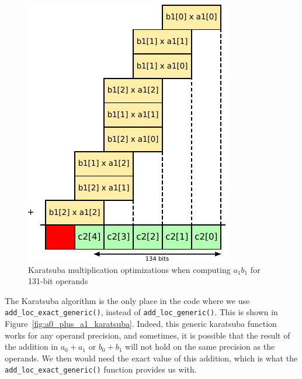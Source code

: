 \documentclass[12pt, a4paper]{report}
\begin{document}
\begin{figure}[h]
\centering
\includegraphics[scale=0.8]{figs/karatsuba_second_level_optimizations}
\caption{Karatsuba multiplication optimizations when computing $a_1 b_1$ for 131-bit operands}
\label{fig:karatsuba_second_level_optimizations}
\end{figure}

The Karatsuba algorithm is the only place in the code where we use
\verb+add_loc_exact_generic()+, instead of \verb+add_loc_generic()+.
This is shown in Figure~\ref{fig:a0_plus_a1_karatsuba}.
Indeed, this generic karatsuba function works for any operand precision, and
sometimes, it is possible that the result of the addition in $a_0 + a_1$ or
$b_0 + b_1$ will not hold on the same precision as the operands.
We then would need the exact value of this addition, which is what the
\verb+add_loc_exact_generic()+ function provides us with.
\end{document}
